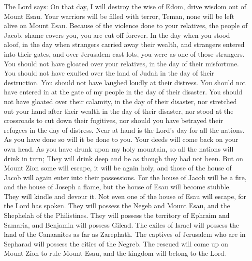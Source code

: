  The Lord says: On that day, I will destroy the wise of
Edom, drive wisdom out of Mount Esau.  Your warriors will be
filled with terror, Teman, none will be left alive on Mount Esau.
 Because of the violence done to your relatives, the people
of Jacob, shame covers you, you are cut off forever.  In
the day when you stood aloof, in the day when strangers carried away
their wealth, and strangers entered into their gates, and over Jerusalem
cast lots, you were as one of those strangers.  You should
not have gloated over your relatives, in the day of their misfortune.
You should not have exulted over the land of Judah in the day of their
destruction. You should not have laughed loudly at their distress.
 You should not have entered in at the gate of my people in
the day of their disaster. You should not have gloated over their
calamity, in the day of their disaster, nor stretched out your hand
after their wealth in the day of their disaster,  nor stood
at the crossroads to cut down their fugitives, nor should you have
betrayed their refugees in the day of distress.  Near at
hand is the Lord's day for all the nations. As you have done so will it
be done to you. Your deeds will come back on your own head.
 As you have drunk upon my holy mountain, so all the
nations will drink in turn; They will drink deep and be as though they
had not been.  But on Mount Zion some will escape, it will
be again holy, and those of the house of Jacob will again enter into
their possessions.  For the house of Jacob will be a fire,
and the house of Joseph a flame, but the house of Esau will become
stubble. They will kindle and devour it. Not even one of the house of
Esau will escape, for the Lord has spoken.  They will
possess the Negeb and Mount Esau, and the Shephelah of the Philistines.
They will possess the territory of Ephraim and Samaria, and Benjamin
will possess Gilead.  The exiles of Israel will possess the
land of the Canaanites as far as Zarephath. The captives of Jerusalem
who are in Sepharad will possess the cities of the Negreb. 
The rescued will come up on Mount Zion to rule Mount Esau, and the
kingdom will belong to the Lord.
